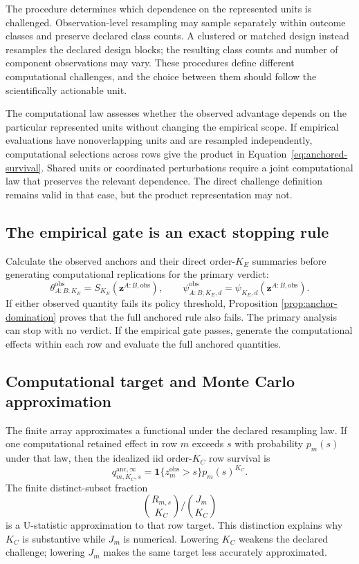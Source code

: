 \documentclass[11pt]{article}
\theoremstyle{remark}
\begin{document}
The procedure determines which dependence on the represented units is
challenged. Observation-level resampling may sample separately within outcome
classes and preserve declared class counts. A clustered or matched design
instead resamples the declared design blocks; the resulting class counts and
number of component observations may vary. These procedures define different
computational challenges, and the choice between them should follow the
scientifically actionable unit.

The computational law assesses whether the observed advantage depends on the
particular represented units without changing the empirical scope. If
empirical evaluations have nonoverlapping units and are resampled independently,
computational selections across rows give the product in
Equation~\eqref{eq:anchored-survival}. Shared units or coordinated
perturbations require a joint computational law that preserves the relevant
dependence. The direct challenge definition remains valid in that case, but
the product representation may not.

\subsection{The empirical gate is an exact stopping rule}

Calculate the observed anchors and their direct order-$K_E$ summaries before
generating computational replications for the primary verdict:
\[
\theta^{\mathrm{obs}}_{A:B;K_E}
=S_{K_E}(\mathbf z^{A:B,\mathrm{obs}}),
\qquad
\psi^{\mathrm{obs}}_{A:B;K_E,d}
=\psi_{K_E,d}(\mathbf z^{A:B,\mathrm{obs}}).
\]
If either observed quantity fails its policy threshold, Proposition
\ref{prop:anchor-domination} proves that the full anchored rule also fails.
The primary analysis can stop with no verdict. If the empirical gate passes, generate the computational effects within each
row and evaluate the full anchored quantities. 

\subsection{Computational target and Monte Carlo approximation}

The finite array approximates a functional under the declared resampling law.
If one computational retained effect in row $m$ exceeds $s$ with probability
$p_m(s)$ under that law, then the idealized iid order-$K_C$ row survival is
\begin{equation}
q^{\mathrm{anc},\infty}_{m,K_C,s}
=
\mathbf 1\{z_m^{\mathrm{obs}}>s\}p_m(s)^{K_C}.
\label{eq:ideal-row-survival}
\end{equation}
The finite distinct-subset fraction
\[
\binom{R_{m,s}}{K_C}/\binom{J_m}{K_C}
\]
is a U-statistic approximation to that row target. This distinction explains
why $K_C$ is substantive while $J_m$ is numerical. Lowering $K_C$ weakens the
declared challenge; lowering $J_m$ makes the same target less accurately
approximated.
\end{document}
